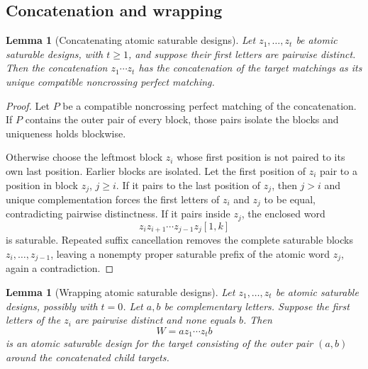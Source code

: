 \documentclass[11pt]{article}
\newtheorem{lemma}[theorem]{Lemma}
\begin{document}
\subsection{Concatenation and wrapping}

\begin{lemma}[Concatenating atomic saturable designs]
\label{lem:concat-atomic}
Let $z_1,\dots,z_t$ be atomic saturable designs, with $t\ge1$, and suppose their first letters are pairwise distinct.  Then the concatenation $z_1\cdots z_t$ has the concatenation of the target matchings as its unique compatible noncrossing perfect matching.
\end{lemma}

\begin{proof}
Let $P$ be a compatible noncrossing perfect matching of the concatenation.  If $P$ contains the outer pair of every block, those pairs isolate the blocks and uniqueness holds blockwise.

Otherwise choose the leftmost block $z_i$ whose first position is not paired to its own last position.  Earlier blocks are isolated.  Let the first position of $z_i$ pair to a position in block $z_j$, $j\ge i$.  If it pairs to the last position of $z_j$, then $j>i$ and unique complementation forces the first letters of $z_i$ and $z_j$ to be equal, contradicting pairwise distinctness.  If it pairs inside $z_j$, the enclosed word
\[
z_i z_{i+1}\cdots z_{j-1} z_j[1,k]
\]
is saturable.  Repeated suffix cancellation removes the complete saturable blocks $z_i,\dots,z_{j-1}$, leaving a nonempty proper saturable prefix of the atomic word $z_j$, again a contradiction.
\end{proof}

\begin{lemma}[Wrapping atomic saturable designs]
\label{lem:wrap-atomic}
Let $z_1,\dots,z_t$ be atomic saturable designs, possibly with $t=0$.  Let $a,b$ be complementary letters.  Suppose the first letters of the $z_i$ are pairwise distinct and none equals $b$.  Then
\[
W=a z_1\cdots z_t b
\]
is an atomic saturable design for the target consisting of the outer pair $(a,b)$ around the concatenated child targets.
\end{lemma}
\end{document}
